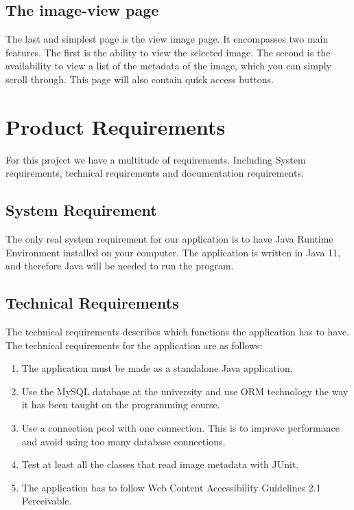 \documentclass{article}
\begin{document}
\subsection{The image-view page}
The last and simplest page is the view image page. It encompasses two main features. The first is the ability to view the selected image. The second is the availability to view a list of the metadata of the image, which you can simply scroll through. This page will also contain quick access buttons.

\section{Product Requirements}
For this project we have a multitude of requirements. Including System requirements, technical requirements and documentation requirements. 
\subsection{System Requirement}
The only real system requirement for our application is to have Java Runtime Environment installed on your computer. The application is written in Java 11, and therefore Java will be needed to run the program.

\subsection{Technical Requirements}
The technical requirements describes which functions the application has to have.
The technical requirements for the application are as follows:
\begin{enumerate}
    \item The application must be made as a standalone Java application.
    \item Use the MySQL database at the university and use ORM technology the way it has been taught on the programming course.
    \item Use a connection  pool  with  one  connection. This is to improve performance and avoid using too many database connections.
    \item Test at least all the classes that read image metadata with JUnit.
    \item The application has to follow Web Content Accessibility Guidelines 2.1 Perceivable.
\end{enumerate}
\end{document}
